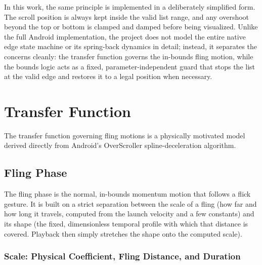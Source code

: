 In this work, the same principle is implemented in a deliberately simplified form. The scroll position is always kept inside the valid list range, and any overshoot beyond the top or bottom is clamped and damped before being visualized. Unlike the full Android implementation, the project does not model the entire native edge state machine or its spring-back dynamics in detail; instead, it separates the concerns cleanly: the transfer function governs the in-bounds fling motion, while the bounds logic acts as a fixed, parameter-independent guard that stops the list at the valid edge and restores it to a legal position when necessary.

\section{Transfer Function}

The transfer function governing fling motions is a physically motivated model derived directly from Android's OverScroller spline-deceleration algorithm.

\subsection{Fling Phase}

The fling phase is the normal, in-bounds momentum motion that follows a flick gesture. It is built on a strict separation between the scale of a fling (how far and how long it travels, computed from the launch velocity and a few constants) and its shape (the fixed, dimensionless temporal profile with which that distance is covered. Playback then simply stretches the shape onto the computed scale).

\subsubsection{Scale: Physical Coefficient, Fling Distance, and Duration}

